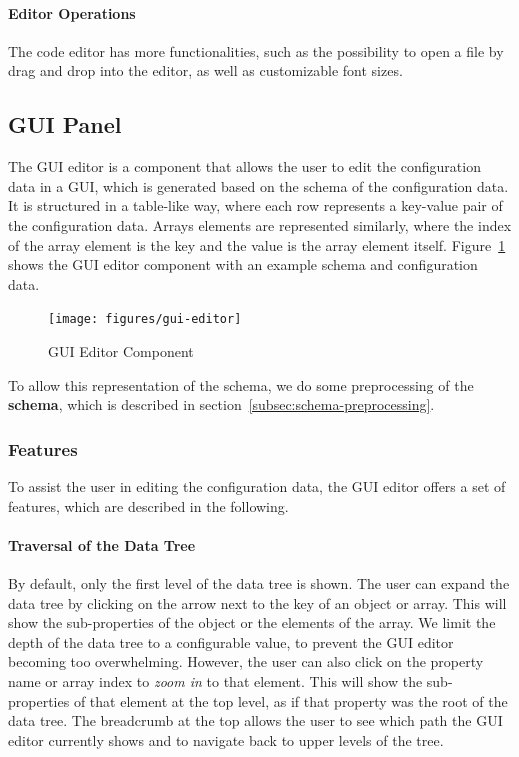 
\paragraph{Editor Operations}
The code editor has more functionalities, such as the possibility to open a file by drag and drop into the editor, as well as customizable font sizes.

\subsection{GUI Panel}\label{subsec:gui-editor}

The GUI editor is a component that allows the user to edit the configuration data in a GUI, which is generated based on the schema of the configuration data.
It is structured in a table-like way, where each row represents a key-value pair of the configuration data.
Arrays elements are represented similarly, where the index of the array element is the key and the value is the array element itself.
Figure~\ref{fig:gui-editor} shows the GUI editor component with an example schema and configuration data.

\begin{figure}[!t]
    \centering
    \texttt{[image: figures/gui-editor]} %
    \caption{GUI Editor Component}
    \label{fig:gui-editor}
\end{figure}

To allow this representation of the schema, we do some preprocessing of the \textbf{schema}, which is described in section~\ref{subsec:schema-preprocessing}.

\subsubsection{Features}\label{subsubsec:gui-editor-features}

To assist the user in editing the configuration data, the GUI editor offers a set of features, which are described in the following.

\paragraph{Traversal of the Data Tree}
By default, only the first level of the data tree is shown.
The user can expand the data tree by clicking on the arrow next to the key of an object or array.
This will show the sub-properties of the object or the elements of the array.
We limit the depth of the data tree to a configurable value, to prevent the GUI editor becoming too overwhelming.
However, the user can also click on the property name or array index to \textit{zoom in} to that element.
This will show the sub-properties of that element at the top level, as if that property was the root of the data tree.
The breadcrumb at the top allows the user to see which path the GUI editor currently shows and to navigate back to upper levels of the tree.

